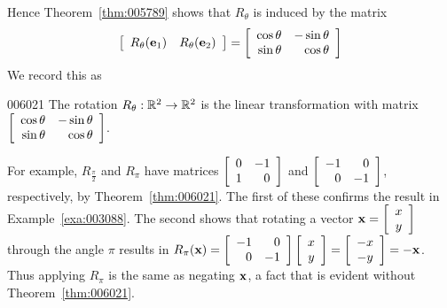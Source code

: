 \noindent Hence Theorem~\ref{thm:005789} shows that $R_{\theta}$ is induced by the matrix
\begin{equation*}
\left[ \begin{array}{cc}
R_{\theta}(\textbf{e}_{1}) & R_{\theta}(\textbf{e}_{2})
\end{array} \right] = \left[ \begin{array}{rr}
\cos \theta & -\sin \theta \\
\sin \theta & \cos \theta
\end{array} \right]
\end{equation*}
We record this as

\begin{theorem}{}{006021}
The rotation $R_{\theta} : \mathbb{R}^2 \to \mathbb{R}^2$ is the linear transformation with matrix $\left[ \begin{array}{rr}
	\cos \theta & -\sin \theta \\
	\sin \theta & \cos \theta
\end{array} \right]$.
\end{theorem}

For example, $R_{\frac{\pi}{2}}$
 and $R_{\pi}$ have matrices $\left[ \begin{array}{rr}
 0 & -1 \\
 1 & 0
 \end{array} \right]$
 and $\left[ \begin{array}{rr}
 -1 & 0 \\
 0 & -1
 \end{array} \right]$, respectively, by Theorem~\ref{thm:006021}. The first of these confirms the result in Example~\ref{exa:003088}. The second shows that rotating a vector $\textbf{x} = \left[ \begin{array}{c}
 x \\
 y
 \end{array} \right]$
 through the angle $\pi$ results in $R_{\pi}(\textbf{x}) = \left[ \begin{array}{rr}
 -1 & 0 \\
 0 & -1
 \end{array} \right] \left[ \begin{array}{c}
 x \\
 y
 \end{array} \right] = \left[ \begin{array}{c}
 -x \\
 -y
 \end{array} \right] = -\textbf{x}$.
 Thus applying $R_{\pi}$ is the same as negating $\textbf{x}$, a fact that is evident without Theorem~\ref{thm:006021}.

